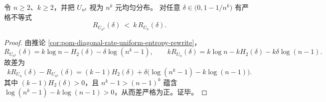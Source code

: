 \begin{theorem}[均匀字母表上的协同严格不等式]\label{thm:pom-diagonal-rate-uniform-synergy-inequality}
令 \(n\ge 2\)、\(k\ge 2\)，并把 \(U_{n^k}\) 视为 \(n^k\) 元均匀分布。
对任意 \(\delta\in\bigl(0,1-1/n^k\bigr)\) 有严格不等式
\[
R_{U_{n^k}}(\delta)\ <\ k\,R_{U_n}(\delta).
\]
\end{theorem}
\begin{proof}
由推论 \ref{cor:pom-diagonal-rate-uniform-entropy-rewrite}，
\[
R_{U_{n^k}}(\delta)=k\log n-H_2(\delta)-\delta\log(n^k-1),
\qquad
kR_{U_n}(\delta)=k\log n-kH_2(\delta)-k\delta\log(n-1).
\]
故差为
\[
kR_{U_n}(\delta)-R_{U_{n^k}}(\delta)
=(k-1)H_2(\delta)+\delta\bigl(\log(n^k-1)-k\log(n-1)\bigr).
\]
其中 \((k-1)H_2(\delta)>0\)，且 \(n^k-1>(n-1)^k\) 蕴含 \(\log(n^k-1)-k\log(n-1)>0\)，从而差严格为正。证毕。
\end{proof}

